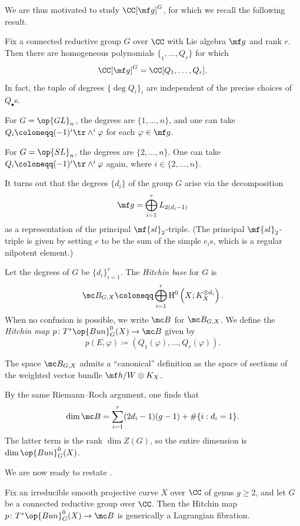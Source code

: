 \documentclass[../notes.tex]{subfiles}
\begin{document}
We are thus motivated to study $\CC[\mf g]^G$, for which we recall the following result.
\begin{theorem}[Chevalley]
	Fix a connected reductive group $G$ over $\CC$ with Lie algebra $\mf g$ and rank $r$. Then there are homogeneous polynomials $\{_1,\ldots,Q_r\}$ for which
	\[\CC[\mf g]^G=\CC[Q_1,\ldots,Q_r].\]
	In fact, the tuple of degrees $\{\deg Q_i\}_i$ are independent of the precise choices of $Q_\bullet$s.
\end{theorem}
\begin{example}
	For $G=\op{GL}_n$, the degrees are $\{1,\ldots,n\}$, and one can take $Q_i\coloneqq(-1)^i\tr\land^i\varphi$ for each $\varphi\in\mf g$.
\end{example}
\begin{example}
	For $G=\op{SL}_n$, the degrees are $\{2,\ldots,n\}$. One can take $Q_i\coloneqq(-1)^i\tr\land^i\varphi$ again, where $i\in\{2,\ldots,n\}$.
\end{example}
\begin{remark}
	It turns out that the degrees $\{d_i\}$ of the group $G$ arise via the decomposition
	\[\mf g=\bigoplus_{i=1}^rL_{2(d_i-1)}\]
	as a representation of the principal $\mf{sl}_2$-triple. (The principal $\mf{sl}_2$-triple is given by setting $e$ to be the sum of the simple $e_i$s, which is a regular nilpotent element.)
\end{remark}
\begin{definition}
	Let the degrees of $G$ be $\{d_i\}_{i=1}^r$. The \textit{Hitchin base} for $G$ is
	\[\mc B_{G,X}\coloneqq\bigoplus_{i=1}^r\mathrm H^0\left(X;K_X^{\otimes d_i}\right).\]
	When no confusion is possible, we write $\mc B$ for $\mc B_{G,X}$. We define the \textit{Hitchin map} $p\colon T^*\op{Bun}_G^0(X)\to\mc B$ given by
	\[p(E,\varphi)\coloneqq(Q_1(\varphi),\ldots,Q_r(\varphi)).\]
\end{definition}
\begin{remark}
	The space $\mc B_{G,X}$ admits a ``canonical'' definition as the space of sections of the weighted vector bundle $\mf h/W\otimes K_X$.
\end{remark}
\begin{remark}
	By the same Riemann--Roch argument, one finds that
	\[\dim\mc B=\sum_{i=1}^r(2d_i-1)(g-1)+\#\{i:d_i=1\}.\]
	The latter term is the rank $\dim Z(G)$, so the entire dimension is $\dim\op{Bun}_G^0(X)$.
\end{remark}
We are now ready to restate .
\begin{theorem} \label{thm:hitchin-general}
	Fix an irreducible smooth projective curve $X$ over $\CC$ of genus $g\ge2$, and let $G$ be a connected reductive group over $\CC$. Then the Hitchin map $p\colon T^*\op{Bun}^0_G(X)\to\mc B$ is generically a Lagrangian fibration.
\end{theorem}
\end{document}
